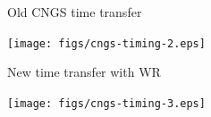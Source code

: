 \documentclass[compress,red]{beamer}
\begin{document}
\begin{frame}{Old CNGS time transfer}

      \begin{center}
      \texttt{[image: figs/cngs-timing-2.eps]}
      \end{center}

\end{frame}
\begin{frame}{New time transfer with WR}

      \begin{center}
      \texttt{[image: figs/cngs-timing-3.eps]}
      \end{center}

\end{frame}
\end{document}
